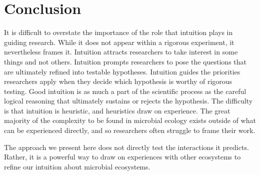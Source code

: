 \section{Conclusion}

It is difficult to overstate the importance of the role that intuition plays in guiding research. While it does not appear within a rigorous experiment, it nevertheless frames it. Intuition attracts researchers to take interest in some things and not others. Intuition prompts researchers to pose the questions that are ultimately refined into testable hypotheses. Intuition guides the priorities researchers apply when they decide which hypothesis is worthy of rigorous testing. Good intuition is as much a part of the scientific process as the careful logical reasoning that ultimately sustains or rejects the hypothesis. The difficulty is that intuition is heuristic, and heuristics draw on experience. The great majority of the complexity to be found in microbial ecology exists outside of what can be experienced directly, and so researchers often struggle to frame their work.

The approach we present here does not directly test the interactions it predicts. Rather, it is a powerful way to draw on experiences with other ecosystems to refine our intuition about microbial ecosystems. 
